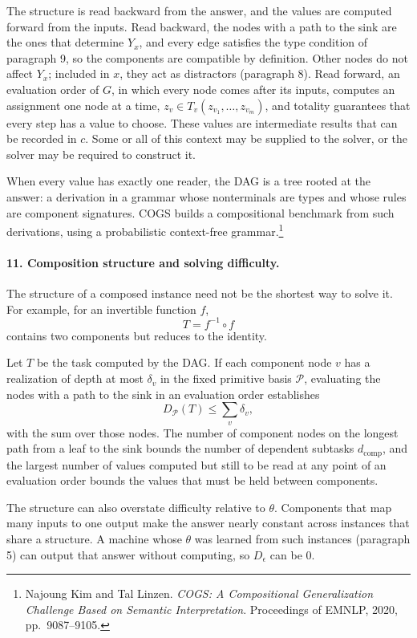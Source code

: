 \documentclass[11pt]{article}
\begin{document}
The structure is read backward from the answer, and the values are
computed forward from the inputs. Read backward, the nodes with a path to
the sink are the ones that determine $Y_x$, and every edge satisfies the
type condition of paragraph 9, so the components are compatible by
definition. Other nodes do not affect $Y_x$; included in $x$, they act as
distractors (paragraph 8). Read forward, an evaluation order of $G$, in
which every node comes after its inputs, computes an assignment one node
at a time, $z_v\in T_v(z_{v_1},\ldots,z_{v_m})$, and totality guarantees
that every step has a value to choose. These values are intermediate
results that can be recorded in $c$. Some or all of this context may be
supplied to the solver, or the solver may be required to construct it.

When every value has exactly one reader, the DAG is a tree rooted at the
answer: a derivation in a grammar whose nonterminals are types and whose
rules are component signatures. COGS builds a compositional benchmark from
such derivations, using a probabilistic context-free
grammar.\footnote{Najoung Kim and Tal Linzen.
\emph{COGS: A Compositional Generalization Challenge Based on Semantic
Interpretation}. Proceedings of EMNLP, 2020, pp.\ 9087--9105.}

\paragraph{11. Composition structure and solving difficulty.}
The structure of a composed instance need not be the shortest way to
solve it. For example, for an invertible function $f$,
\[
T=f^{-1}\circ f
\]
contains two components but reduces to the identity.

Let $T$ be the task computed by the DAG. If each component node $v$ has a
realization of depth at most $\delta_v$ in the fixed primitive basis
$\mathcal P$, evaluating the nodes with a path to the sink in an
evaluation order establishes
\[
D_{\mathcal P}(T)\leq\sum_v\delta_v,
\]
with the sum over those nodes. The number of component nodes on the longest path from a
leaf to the sink bounds the number of dependent subtasks
$d_{\mathrm{comp}}$, and the largest number of values computed but still
to be read at any point of an evaluation order bounds the values that
must be held between components.

The structure can also overstate difficulty relative to $\theta$.
Components that map many inputs to one output make the answer nearly
constant across instances that share a structure. A machine whose
$\theta$ was learned from such instances (paragraph 5) can output that
answer without computing, so $D_\epsilon$ can be $0$.
\end{document}
